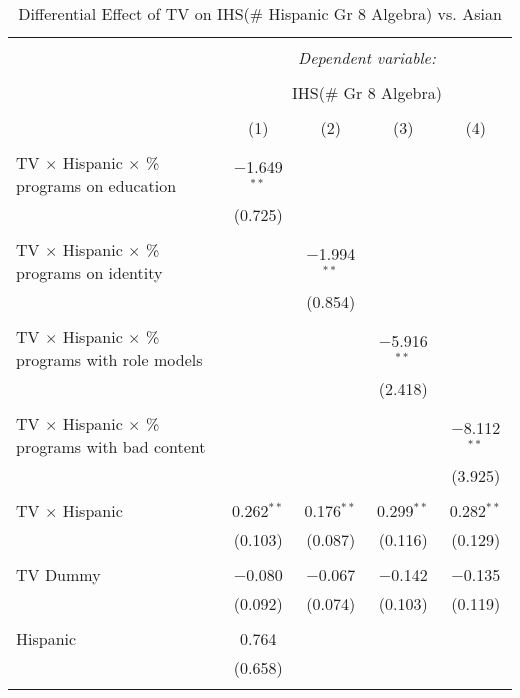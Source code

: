 
\begin{table}[!htbp] \centering 
  \caption{Differential Effect of TV on IHS(\# Hispanic Gr 8 Algebra) vs. Asian} 
  \label{} 
\begin{tabular}{@{\extracolsep{-2pt}}lcccc} 
\\[-1.8ex]\hline 
\hline \\[-1.8ex] 
 & \multicolumn{4}{c}{\textit{Dependent variable:}} \\ 
\cline{2-5} 
\\[-1.8ex] & \multicolumn{4}{c}{IHS(\# Gr 8 Algebra)} \\ 
\\[-1.8ex] & (1) & (2) & (3) & (4)\\ 
\hline \\[-1.8ex] 
 TV $\times$ Hispanic $\times$ \% programs on education & $-$1.649$^{**}$ &  &  &  \\ 
  & (0.725) &  &  &  \\ 
  & & & & \\ 
 TV $\times$ Hispanic $\times$ \% programs on identity &  & $-$1.994$^{**}$ &  &  \\ 
  &  & (0.854) &  &  \\ 
  & & & & \\ 
 TV $\times$ Hispanic $\times$ \% programs with role models &  &  & $-$5.916$^{**}$ &  \\ 
  &  &  & (2.418) &  \\ 
  & & & & \\ 
 TV $\times$ Hispanic $\times$ \% programs with bad content &  &  &  & $-$8.112$^{**}$ \\ 
  &  &  &  & (3.925) \\ 
  & & & & \\ 
 TV $\times$ Hispanic & 0.262$^{**}$ & 0.176$^{**}$ & 0.299$^{**}$ & 0.282$^{**}$ \\ 
  & (0.103) & (0.087) & (0.116) & (0.129) \\ 
  & & & & \\ 
 TV Dummy & $-$0.080 & $-$0.067 & $-$0.142 & $-$0.135 \\ 
  & (0.092) & (0.074) & (0.103) & (0.119) \\ 
  & & & & \\ 
 Hispanic & 0.764 &  &  &  \\ 
  & (0.658) &  &  &  \\ 
  & & & & \\ 

\end{tabular}
\end{table}

